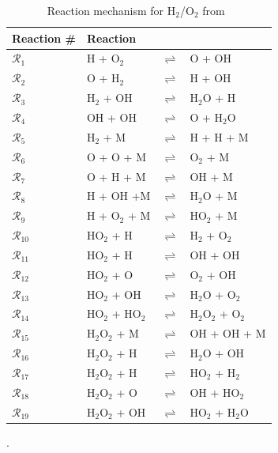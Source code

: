 \begin{table}[htbp]
\renewcommand*{\arraystretch}{1.2}
\begin{center}
\begin{tabular}{llll}
\toprule
Reaction \#     & Reaction &&\\
\bottomrule
$\mathcal{R}_1$ & H + O$_2$          & $\rightleftharpoons$ & O + OH \\
$\mathcal{R}_2$ & O + H$_2$          & $\rightleftharpoons$ & H + OH \\
$\mathcal{R}_3$ & H$_2$ + OH         & $\rightleftharpoons$ & H$_2$O + H \\
$\mathcal{R}_4$ & OH + OH            & $\rightleftharpoons$ & O + H$_2$O \\
$\mathcal{R}_5$ & H$_2$ + M          & $\rightleftharpoons$ & H + H + M \\
$\mathcal{R}_6$ & O + O + M          & $\rightleftharpoons$ & O$_2$ + M \\
$\mathcal{R}_7$ & O + H + M          & $\rightleftharpoons$ & OH + M \\
$\mathcal{R}_8$ & H + OH +M          & $\rightleftharpoons$ & H$_2$O + M \\
$\mathcal{R}_9$ & H + O$_2$ + M      & $\rightleftharpoons$ & HO$_2$ + M \\
$\mathcal{R}_{10}$ & HO$_2$ + H      & $\rightleftharpoons$ & H$_2$ + O$_2$ \\
$\mathcal{R}_{11}$ & HO$_2$ + H      & $\rightleftharpoons$ & OH + OH \\
$\mathcal{R}_{12}$ & HO$_2$ + O      & $\rightleftharpoons$ & O$_2$ + OH \\
$\mathcal{R}_{13}$ & HO$_2$ + OH     & $\rightleftharpoons$ & H$_2$O + O$_2$ \\
$\mathcal{R}_{14}$ & HO$_2$ + HO$_2$ & $\rightleftharpoons$ & H$_2$O$_2$ + O$_2$ \\
$\mathcal{R}_{15}$ & H$_2$O$_2$ + M  & $\rightleftharpoons$ & OH + OH + M \\
$\mathcal{R}_{16}$ & H$_2$O$_2$ + H  & $\rightleftharpoons$ & H$_2$O + OH \\
$\mathcal{R}_{17}$ & H$_2$O$_2$ + H  & $\rightleftharpoons$ & HO$_2$ + H$_2$ \\
$\mathcal{R}_{18}$ & H$_2$O$_2$ + O  & $\rightleftharpoons$ & OH + HO$_2$ \\
$\mathcal{R}_{19}$ & H$_2$O$_2$ + OH & $\rightleftharpoons$ & HO$_2$ + H$_2$O \\
\bottomrule
\end{tabular}
\end{center}
\caption{Reaction mechanism for H$_2$/O$_2$ from~\cite{Yetter:1991}}.
\label{tab:kinetics}
\end{table}


